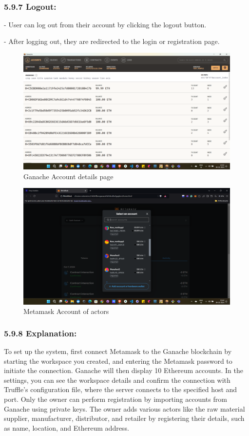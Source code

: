 \documentclass[runningheads]{llncs}
\begin{document}
\subsubsection{5.9.7 Logout: }
- User can log out from their account by clicking the logout button. 

- After logging out, they are redirected to the login or registration page.


\begin{figure}
\includegraphics[width=\textwidth]{assets/Fig 5.5.png}
\caption{Ganache Account details page} \label{fig1}
\end{figure}

\begin{figure}
\includegraphics[width=\textwidth]{assets/Fig 5.10.png}
\caption{Metamask Account of actors} \label{fig1}
\end{figure}

\subsubsection{5.9.8 Explanation:}
To set up the system, first connect Metamask to the Ganache blockchain by starting the workspace you created, and entering the Metamask password to initiate the connection. Ganache will then display 10 Ethereum accounts. In the settings, you can see the workspace details and confirm the connection with Truffle's configuration file, where the server connects to the specified host and port. Only the owner can perform registration by importing accounts from Ganache using private keys. The owner adds various actors like the raw material supplier, manufacturer, distributor, and retailer by registering their details, such as name, location, and Ethereum address.
\end{document}

